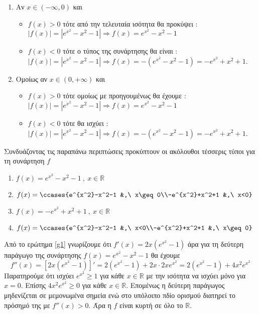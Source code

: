 \documentclass[internet]{diag-pan-xelatex}
\begin{document}
\begin{thema}
\begin{erwthma}
\begin{enumerate}[label=\roman*.]
\item Αν $ x\in(-\infty,0) $ και
\begin{itemize}
\item $ f(x)>0 $ τότε από την τελευταία ισότητα θα προκύψει : $ |f(x)|=\left| e^{x^2}-x^2-1\right|\Rightarrow f(x)=e^{x^2}-x^2-1 $
\item $ f(x)<0 $ τότε ο τύπος της συνάρτησης θα είναι : $ |f(x)|=\left| e^{x^2}-x^2-1\right|\Rightarrow f(x)=-\left( e^{x^2}-x^2-1\right)=-e^{x^2}+x^2+1 $.
\end{itemize}
\item Ομοίως αν $ x\in(0,+\infty) $ και
\begin{itemize}
\item $ f(x)>0 $ τότε ομοίως με προηγουμένως θα έχουμε : $ |f(x)|=\left| e^{x^2}-x^2-1\right|\Rightarrow f(x)=e^{x^2}-x^2-1 $
\item $ f(x)<0 $ τότε θα ισχύει : $ |f(x)|=\left| e^{x^2}-x^2-1\right|\Rightarrow f(x)=-\left( e^{x^2}-x^2-1\right)=-e^{x^2}+x^2+1 $.
\end{itemize}
\end{enumerate}
Συνδυάζοντας τις παραπάνω περιπτώσεις προκύπτουν οι ακόλουθοι τέσσερις τύποι για τη συνάρτηση $ f $
\begin{multicols}{2}
\begin{enumerate}
\item $ f(x)=e^{x^2}-x^2-1\ ,\ x\in\mathbb{R} $
\item $ f(x)=\ccases{e^{x^2}-x^2-1 &,\  x\geq0\\-e^{x^2}+x^2+1 &,\  x<0} $
\item $ f(x)=-e^{x^2}+x^2+1\ ,\ x\in\mathbb{R} $
\item $ f(x)=\ccases{e^{x^2}-x^2-1 &,\  x<0\\-e^{x^2}+x^2+1 &,\  x\geq0} $
\end{enumerate}
\end{multicols}
\item Από το ερώτημα \ref{g1} γνωρίζουμε ότι $ f'(x)=2x\left( e^{x^2}-1\right) $ άρα για τη δεύτερη παράγωγο της συνάρτησης $ f(x)=e^{x^2}-x^2-1 $ θα έχουμε
\[ f''(x)=\left[2x\left( e^{x^2}-1\right)\right]'=2\left( e^{x^2}-1\right)+2x\cdot2x e^{x^2}=2\left( e^{x^2}-1\right)+4x^2e^{x^2} \]
Παρατηρούμε ότι ισχύει $ e^{x^2}\geq1 $ για κάθε $ x\in\mathbb{R} $ με την ισότητα να ισχύει μόνο για $ x=0 $. Επίσης $ 4x^2e^{x^2}\geq0 $ για κάθε $ x\in\mathbb{R} $. Επομένως η δεύτερη παράγωγος μηδενίζεται σε μεμονωμένα σημεία ενώ στο υπόλοιπο πδίο ορισμού διατηρεί το πρόσημό της με $ f''(x)>0 $. Άρα η $ f $ είναι κυρτή σε όλο το $ \mathbb{R} $.\\

\end{erwthma}
\end{thema}
\end{document}
